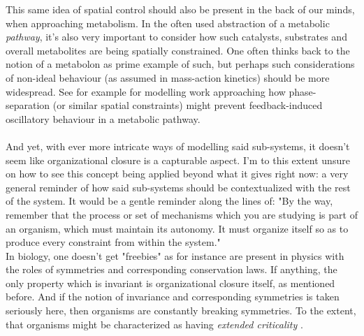 \documentclass[a4paper,12pt,twoside,leqno]{article}
\begin{document}
This same idea of spatial control should also be present in the back of our minds, when approaching metabolism. In the often used abstraction of a metabolic \textit{pathway}, it's also very important to consider how such catalysts, substrates and overall metabolites are being spatially constrained. One often thinks back to the notion of a metabolon as prime example of such, but perhaps such considerations of non-ideal behaviour (as assumed in mass-action kinetics) should be more widespread. See \cite{lauber2023collective} for example for modelling work approaching how phase-separation (or similar spatial constraints) might prevent feedback-induced oscillatory behaviour in a metabolic pathway. \paragraph*{}
And yet, with ever more intricate ways of modelling said sub-systems, it doesn't seem like organizational closure is a capturable aspect. I'm to this extent unsure on how to see this concept being applied beyond what it gives right now: a very general reminder of how said sub-systems should be contextualized with the rest of the system. It would be a gentle reminder along the lines of: "By the way, remember that the process or set of mechanisms which you are studying is part of an organism, which must maintain its autonomy. It must organize itself so as to produce every constraint from within the system."\\
In biology, one doesn't get "freebies" as for instance are present in physics with the roles of symmetries and corresponding conservation laws. If anything, the only property which is invariant is organizational closure itself, as mentioned before. And if the notion of invariance and corresponding symmetries is taken seriously here, then organisms are constantly breaking symmetries. To the extent, that organisms might be characterized as  having \textit{extended criticality} \citep{longo2014physics}. 


\end{document}
